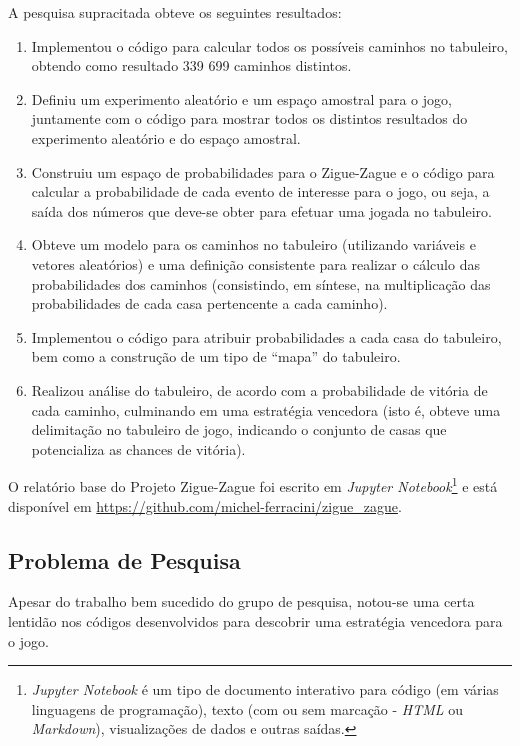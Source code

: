 \documentclass[12pt]{article}
\newcommand{\aspas}[1]{``#1''} %
\begin{document}
A pesquisa supracitada obteve os seguintes resultados:

\begin{enumerate}
	\item Implementou o código para calcular todos os possíveis caminhos no tabuleiro, obtendo como resultado 339 699 caminhos distintos.
	\item Definiu um experimento aleatório e um espaço amostral para o jogo, juntamente com o código para mostrar todos os distintos resultados do experimento aleatório e do espaço amostral.
	\item Construiu um espaço de probabilidades para o Zigue-Zague e o código para calcular a probabilidade de cada evento de interesse para o jogo, ou seja, a saída dos números que deve-se obter para efetuar uma jogada no tabuleiro.
	\item Obteve um modelo para os caminhos no tabuleiro (utilizando variáveis e vetores aleatórios) e uma definição consistente para realizar o cálculo das probabilidades dos caminhos (consistindo, em síntese, na multiplicação das probabilidades de cada casa pertencente a cada caminho).
	\item Implementou o código para atribuir probabilidades a cada casa do tabuleiro, bem como a construção de um tipo de \aspas{mapa} do tabuleiro.
	\item Realizou análise do tabuleiro, de acordo com a probabilidade de vitória de cada caminho, culminando em uma estratégia vencedora (isto é, obteve uma delimitação no tabuleiro de jogo, indicando o conjunto de casas que potencializa as chances de vitória).
\end{enumerate}

O relatório base do Projeto Zigue-Zague foi escrito em \textit{Jupyter Notebook}\footnote{\textit{Jupyter Notebook} é um tipo de documento interativo para código (em várias linguagens de programação), texto (com ou sem marcação - \textit{HTML} ou \textit{Markdown}), visualizações de dados e outras saídas.} e está disponível em \url{https://github.com/michel-ferracini/zigue_zague}.

\subsection{Problema de Pesquisa}
\label{problema_pesquisa}

Apesar do trabalho bem sucedido do grupo de pesquisa, notou-se uma certa lentidão nos códigos desenvolvidos para descobrir uma estratégia vencedora para o jogo.
\end{document}
